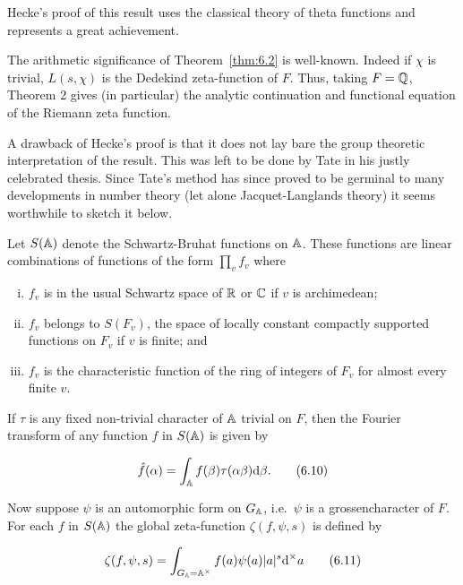 Hecke's proof of this result uses the classical theory of theta functions and represents a great achievement.

The arithmetic significance of Theorem~\ref{thm:6.2} is well-known. Indeed if $\chi$ is trivial, $L(s,\chi)$ is the Dedekind zeta-function of $F$. Thus, taking $F = \mathbb{Q}$, Theorem 2 gives (in particular) the analytic continuation and functional equation of the Riemann zeta function.

A drawback of Hecke's proof is that it does not lay bare the group theoretic interpretation of the result. This was left to be done by Tate in his justly celebrated thesis. Since Tate's method has since proved to be germinal to many developments in number theory (let alone Jacquet-Langlands theory) it seems worthwhile to sketch it below.

Let $S(\mathbb{A})$ denote the Schwartz-Bruhat functions on $\mathbb{A}$. These functions are linear combinations of functions of the form $\prod_v f_v$ where

\begin{enumerate}[(i)]

\item $f_v$ is in the usual Schwartz space of $\mathbb{R}$ or $\mathbb{C}$ if $v$ is archimedean;

\item $f_v$ belongs to $S(F_v)$, the space of locally constant compactly supported functions on $F_v$ if $v$ is finite; and

\item $f_v$ is the characteristic function of the ring of integers of $F_v$ for almost every finite $v$.

\end{enumerate}

If $\tau$ is any fixed non-trivial character of $\mathbb{A}$ trivial on $F$, then the Fourier transform of any function $f$ in $S(\mathbb{A})$ is given by

\begin{equation}\label{eq:6.10}
\hat{f}(\alpha) = \int_{\mathbb{A}} f(\beta) \tau(\alpha\beta) \mathrm{d}\beta.\tag{6.10}
\end{equation}

Now suppose $\psi$ is an automorphic form on $G_{\mathbb{A}}$, i.e.\ $\psi$ is a grossencharacter of $F$. For each $f$ in $S(\mathbb{A})$ the global zeta-function $\zeta(f, \psi, s)$ is defined by

\begin{equation}\label{eq:6.11}
\zeta(f, \psi, s) = \int_{G_{\mathbb{A}} = \mathbb{A}^{\times}} f(a)\psi(a) |a|^s \mathrm{d}^{\times} a\tag{6.11}
\end{equation}

